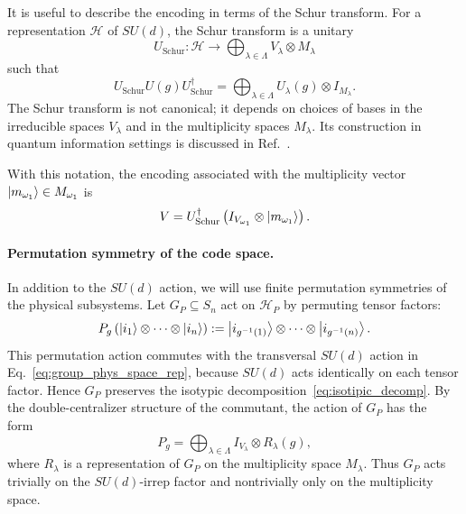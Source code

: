 \documentclass[10pt,twocolumn,superscriptaddress,aps,amsmath,amssymb,citeautoscript,floatfix,prx]{revtex4-2}
\theoremstyle{plain}
\theoremstyle{plain}
\theoremstyle{plain}
\theoremstyle{plain}
\theoremstyle{plain}
\theoremstyle{plain}
\begin{document}
It is useful to describe the encoding in terms of the Schur transform. For a representation $\mathcal H$ of $SU(d)$, the Schur transform is a unitary
$$
U_{\mathrm{Schur}}:
\mathcal H
\longrightarrow
\bigoplus_{\lambda\in\Lambda}
V_\lambda\otimes M_\lambda
$$
such that
\begin{equation}\label{eq:schur_transform}
U_{\mathrm{Schur}}
U(g)
U_{\mathrm{Schur}}^\dagger
=
\bigoplus_{\lambda\in\Lambda}
U_\lambda(g)\otimes I_{M_\lambda}.
\end{equation}
The Schur transform is not canonical; it depends on choices of bases in the irreducible spaces $V_\lambda$ and in the multiplicity spaces $M_\lambda$. Its construction in quantum information settings is discussed in Ref.~\cite{Bacon2006}.

With this notation, the encoding associated with the multiplicity vector $\ket{m_{\omega_1}}\in M_{\omega_1}$ is
\begin{equation}\label{eq:schur_transform_enc}
V
=
U_{\mathrm{Schur}}^\dagger
\left(
I_{V_{\omega_1}}
\otimes
\ket{m_{\omega_1}}
\right).
\end{equation}

\paragraph{Permutation symmetry of the code space.}

In addition to the $SU(d)$ action, we will use finite permutation symmetries of the physical subsystems. Let $G_P\subseteq S_n$ act on $\mathcal H_P$ by permuting tensor factors:
\begin{equation}\label{eq:group_act_on_phys_space}
P_g
\left(
\ket{i_1}\otimes\cdots\otimes\ket{i_n}
\right)
:=
\ket{i_{g^{-1}(1)}}\otimes\cdots\otimes\ket{i_{g^{-1}(n)}} .
\end{equation}
This permutation action commutes with the transversal $SU(d)$ action in Eq.~\eqref{eq:group_phys_space_rep}, because $SU(d)$ acts identically on each tensor factor. Hence $G_P$ preserves the isotypic decomposition~\eqref{eq:isotipic_decomp}. By the double-centralizer structure of the commutant, the action of $G_P$ has the form~\cite{GoodmanWallach2009}
\begin{equation}\label{eq:group_act_on_code}
P_g
=
\bigoplus_{\lambda\in\Lambda}
I_{V_\lambda}\otimes R_\lambda(g),
\end{equation}
where $R_\lambda$ is a representation of $G_P$ on the multiplicity space $M_\lambda$. Thus $G_P$ acts trivially on the $SU(d)$-irrep factor and nontrivially only on the multiplicity space.
\end{document}
